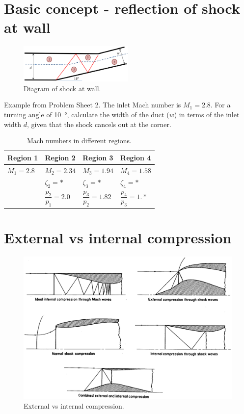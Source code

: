 \documentclass[class=report, crop=false, 12pt,a4paper]{standalone}
\begin{document}
\section{Basic concept - reflection of shock at wall}
\begin{figure}[H]
    \centering
    \includegraphics[width = 0.5\textwidth]{../img/diagram48.png}
    \caption{Diagram of shock at wall.}
\end{figure}
Example from Problem Sheet 2. The inlet Mach number is $M_1 = 2.8$. For a turning angle of \SI{10}{\degree}, calculate the width of the duct ($w$) in terms of the inlet width $d$, given that the shock cancels out at the corner.
\begin{table}[H]
    \centering
    \begin{tabular}{@{}llll@{}}
        \toprule
        Region 1    & Region 2                 & Region 3                  & Region 4                 \\ \midrule
        $M_1 = 2.8$ & $M_2 = 2.34$             & $M_3 = 1.94$              & $M_4 = 1.58$             \\
                    & $\zeta_2 = *$            & $\zeta_3 = *$             & $\zeta_4 = *$            \\
                    & $\dfrac{p_2}{p_1} = 2.0$ & $\dfrac{p_3}{p_2} = 1.82$ & $\dfrac{p_4}{p_3} = 1.*$ \\ \bottomrule
    \end{tabular}
    \caption{Mach numbers in different regions.}
\end{table}
\section{External vs internal compression}
\begin{figure}[H]
    \centering
    \includegraphics[width = \textwidth]{../img/diagram49.png}
    \caption{External vs internal compression.}
\end{figure}
\end{document}
